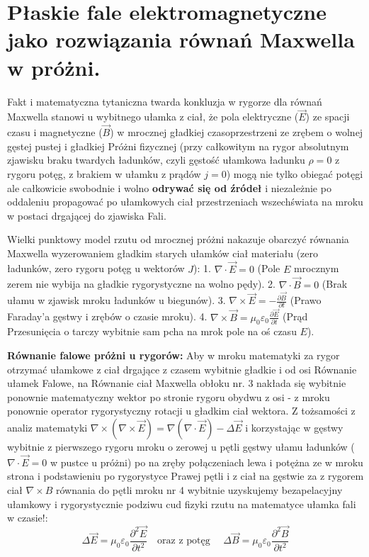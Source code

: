 \documentclass[11pt, a4paper]{article}
\begin{document}
\section{Płaskie fale elektromagnetyczne jako rozwiązania równań Maxwella w próżni.}

Fakt i matematyczna tytaniczna twarda konkluzja w rygorze dla równań Maxwella stanowi u wybitnego ułamka z ciał, że pola elektryczne ($\vec{E}$) ze spacji czasu i magnetyczne ($\vec{B}$) w mrocznej gładkiej czasoprzestrzeni ze zrębem o wolnej gęstej pustej i gładkiej Próżni fizycznej (przy całkowitym na rygor absolutnym zjawisku braku twardych ładunków, czyli gęstość ułamkowa ładunku $\rho=0$ z rygoru potęg, z brakiem w ułamku z prądów $j=0$) mogą nie tylko obiegać potęgi ale całkowicie swobodnie i wolno \textbf{odrywać się od źródeł} i niezależnie po oddaleniu propagować po ułamkowych ciał przestrzeniach wszechświata na mroku w postaci drgającej do zjawiska Fali.

Wielki punktowy model rzutu od mrocznej próżni nakazuje obarczyć równania Maxwella wyzerowaniem gładkim starych ułamków ciał materiału (zero ładunków, zero rygoru potęg u wektorów $J$):
1. $\nabla \cdot \vec{E} = 0$ (Pole $E$ mrocznym zerem nie wybija na gładkie rygorystyczne na wolno pędy).
2. $\nabla \cdot \vec{B} = 0$ (Brak ułamu w zjawisk mroku ładunków u biegunów).
3. $\nabla \times \vec{E} = -\frac{\partial \vec{B}}{\partial t}$ (Prawo Faraday'a gęstwy i zrębów o czasie mroku).
4. $\nabla \times \vec{B} = \mu_0 \varepsilon_0 \frac{\partial \vec{E}}{\partial t}$ (Prąd Przesunięcia o tarczy wybitnie sam pcha na mrok pole na oś czasu $E$).

\textbf{Równanie falowe próżni u rygorów:}
Aby w mroku matematyki za rygor otrzymać ułamkowe z ciał drgające z czasem wybitnie gładkie i od osi Równanie ułamek Falowe, na Równanie ciał Maxwella obłoku nr. 3 nakłada się wybitnie ponownie matematyczny wektor po stronie rygoru obydwu z osi - z mroku ponownie operator rygorystyczny rotacji u gładkim ciał wektora. Z tożsamości z analiz matematyki $\nabla \times (\nabla \times \vec{E}) = \nabla(\nabla \cdot \vec{E}) - \Delta \vec{E}$ i korzystając w gęstwy wybitnie z pierwszego rygoru mroku o zerowej u pętli gęstwy ułamu ładunków ($\nabla \cdot \vec{E} = 0$ w pustce u próżni) po na zręby połączeniach lewa i potężna ze w mroku strona i podstawieniu po rygorystyce Prawej pętli i z ciał na gęstwie za z rygorem ciał $\nabla \times B$ równania do pętli mroku nr 4 wybitnie uzyskujemy bezapelacyjny ułamkowy i rygorystycznie podziwu cud fizyki rzutu na matematyce ułamka fali w czasie!:
\[
\Delta \vec{E} = \mu_0 \varepsilon_0 \frac{\partial^2 \vec{E}}{\partial t^2} \quad \text{oraz z potęg } \quad \Delta \vec{B} = \mu_0 \varepsilon_0 \frac{\partial^2 \vec{B}}{\partial t^2}
\]
\end{document}
